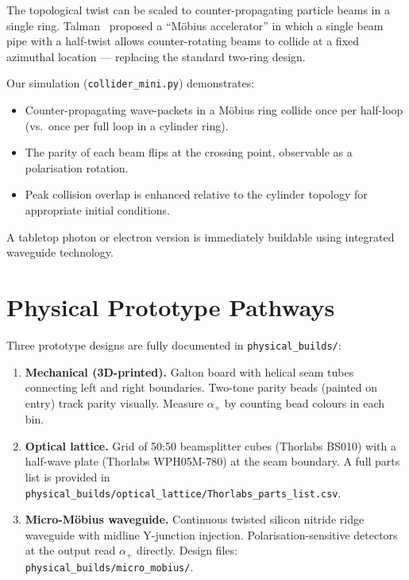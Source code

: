 \documentclass[12pt,a4paper]{article}
\newcommand{\alphap}{\alpha_+}
\begin{document}
The topological twist can be scaled to counter-propagating particle beams
in a single ring. Talman~\cite{talman1995,talman1996patent} proposed a
``Möbius accelerator'' in which a single beam pipe with a half-twist allows
counter-rotating beams to collide at a fixed azimuthal location — replacing
the standard two-ring design.

Our simulation (\texttt{collider\_mini.py}) demonstrates:
\begin{itemize}
  \item Counter-propagating wave-packets in a Möbius ring collide once per
        half-loop (vs.\ once per full loop in a cylinder ring).
  \item The parity of each beam flips at the crossing point, observable as
        a polarisation rotation.
  \item Peak collision overlap is enhanced relative to the cylinder topology
        for appropriate initial conditions.
\end{itemize}

A tabletop photon or electron version is immediately buildable using
integrated waveguide technology.

\section{Physical Prototype Pathways}
\label{sec:prototypes}

Three prototype designs are fully documented in \texttt{physical\_builds/}:

\begin{enumerate}
  \item \textbf{Mechanical (3D-printed).} Galton board with helical seam
        tubes connecting left and right boundaries. Two-tone parity beads
        (painted on entry) track parity visually. Measure $\alphap$ by
        counting bead colours in each bin.

  \item \textbf{Optical lattice.} Grid of 50:50 beamsplitter cubes
        (Thorlabs BS010) with a half-wave plate (Thorlabs WPH05M-780) at
        the seam boundary. A full parts list is provided in
        \texttt{physical\_builds/optical\_lattice/Thorlabs\_parts\_list.csv}.

  \item \textbf{Micro-Möbius waveguide.} Continuous twisted silicon
        nitride ridge waveguide with midline Y-junction injection.
        Polarisation-sensitive detectors at the output read $\alphap$
        directly. Design files: \texttt{physical\_builds/micro\_mobius/}.
\end{enumerate}
\end{document}
